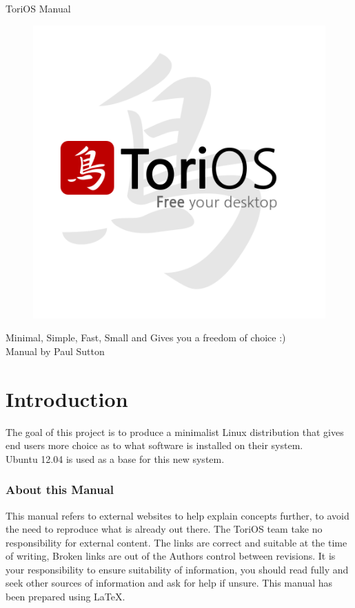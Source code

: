 \documentclass[12pt,a4paper]{book}
\author{Paul Sutton}
\begin{document}
\begin{center}
{\Huge ToriOS Manual}
\end{center}



\begin{figure}
\centering
\includegraphics[width=0.7\linewidth]{./FinalLogo}

\end{figure}


\begin{center}
Minimal, Simple, Fast, Small and Gives you a freedom of choice :) \\
Manual by Paul Sutton
\end{center}

\tableofcontents
{}
\chapter{Introduction}
The goal of this project is to produce a minimalist Linux distribution that gives end users more choice as to what software is installed on their system.\\

Ubuntu 12.04 is used as a base for this new system.
\subsection{About this Manual}
This manual refers to external websites to help explain concepts further, to avoid the need to reproduce what is already out there.  The ToriOS team take no responsibility for external content.  The links are correct and suitable at the time of writing,  Broken links are out of the Authors control between revisions.  It is your responsibility to ensure suitability of information, you should read fully and seek other sources of information and ask for help if unsure.  
This manual has been prepared using \LaTeX.
\end{document}
